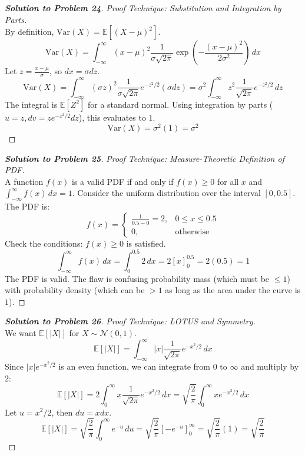\documentclass[11pt, a4paper]{article}
\theoremstyle{definition}
\theoremstyle{remark}
\newcommand{\E}{\mathbb{E}}
\begin{document}
\begin{proof}[\textbf{Solution to Problem 24}]
\textit{Proof Technique: Substitution and Integration by Parts.} \\
By definition, $\text{Var}(X) = \E[(X-\mu)^2]$.
\[ \text{Var}(X) = \int_{-\infty}^{\infty} (x-\mu)^2 \frac{1}{\sigma\sqrt{2\pi}} \exp\left(-\frac{(x-\mu)^2}{2\sigma^2}\right) \, dx \]
Let $z = \frac{x-\mu}{\sigma}$, so $dx = \sigma dz$.
\[ \text{Var}(X) = \int_{-\infty}^{\infty} (\sigma z)^2 \frac{1}{\sigma\sqrt{2\pi}} e^{-z^2/2} (\sigma dz) = \sigma^2 \int_{-\infty}^{\infty} z^2 \frac{1}{\sqrt{2\pi}} e^{-z^2/2} \, dz \]
The integral is $\E[Z^2]$ for a standard normal. Using integration by parts ($u=z, dv=z e^{-z^2/2}dz$), this evaluates to $1$.
\[ \text{Var}(X) = \sigma^2 (1) = \sigma^2 \]
\end{proof}

\begin{proof}[\textbf{Solution to Problem 25}]
\textit{Proof Technique: Measure-Theoretic Definition of PDF.} \\
A function $f(x)$ is a valid PDF if and only if $f(x) \geq 0$ for all $x$ and $\int_{-\infty}^{\infty} f(x) \, dx = 1$.
Consider the uniform distribution over the interval $[0, 0.5]$. The PDF is:
\[ f(x) = \begin{cases} \frac{1}{0.5 - 0} = 2, & 0 \leq x \leq 0.5 \\ 0, & \text{otherwise} \end{cases} \]
Check the conditions: $f(x) \geq 0$ is satisfied.
\[ \int_{-\infty}^{\infty} f(x) \, dx = \int_{0}^{0.5} 2 \, dx = 2[x]_0^{0.5} = 2(0.5) = 1 \]
The PDF is valid. The flaw is confusing probability mass (which must be $\leq 1$) with probability density (which can be $>1$ as long as the area under the curve is $1$).
\end{proof}

\begin{proof}[\textbf{Solution to Problem 26}]
\textit{Proof Technique: LOTUS and Symmetry.} \\
We want $\E[|X|]$ for $X \sim \mathcal{N}(0, 1)$.
\[ \E[|X|] = \int_{-\infty}^{\infty} |x| \frac{1}{\sqrt{2\pi}} e^{-x^2/2} \, dx \]
Since $|x| e^{-x^2/2}$ is an even function, we can integrate from $0$ to $\infty$ and multiply by $2$:
\[ \E[|X|] = 2 \int_{0}^{\infty} x \frac{1}{\sqrt{2\pi}} e^{-x^2/2} \, dx = \sqrt{\frac{2}{\pi}} \int_{0}^{\infty} x e^{-x^2/2} \, dx \]
Let $u = x^2/2$, then $du = x dx$.
\[ \E[|X|] = \sqrt{\frac{2}{\pi}} \int_{0}^{\infty} e^{-u} \, du = \sqrt{\frac{2}{\pi}} \left[ -e^{-u} \right]_0^\infty = \sqrt{\frac{2}{\pi}} (1) = \sqrt{\frac{2}{\pi}} \]
\end{proof}
\end{document}
